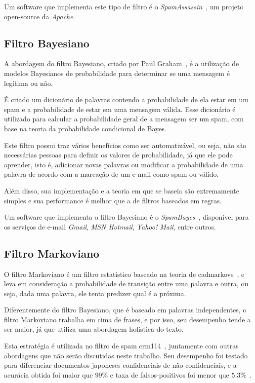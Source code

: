 \documentclass[a4paper,dvipdfm]{article}
\begin{document}
		Um software que implementa este tipo de filtro é o \emph{SpamAssassin}~\cite{spamassassin}, um projeto open-source da \emph{Apache}.

	\subsection{Filtro Bayesiano}
		A abordagem do filtro Bayesiano, criado por Paul Graham~\cite{bayes:graham}, é a utilização de modelos Bayesianos de probabilidade para determinar se uma mensagem é legítima ou não.

		É criado um dicionário de palavras contendo a probabilidade de ela estar em um spam e a probabilidade de estar em uma mensagem válida. Esse dicionário é utilizado para calcular a probabilidade geral de a mensagem ser um spam, com base na teoria da probabilidade condicional de Bayes.

		Este filtro possui traz vários benefícios como ser automatizável, ou seja, não são necessárias pessoas para definir os valores de probabilidade, já que ele pode aprender, isto é, adicionar novas palavras ou modificar a probabilidade de uma palavra de acordo com a marcação de um e-mail como spam ou válido.

		Além disso, sua implementação e a teoria em que se baseia são extremamente simples e sua performance é melhor que a de filtros baseados em regras.
		
		Um software que implementa o filtro Bayesiano é o \emph{SpamBayes}~\cite{spambayes}, disponível para os serviços de e-mail \emph{Gmail}, \emph{MSN Hotmail}, \emph{Yahoo! Mail}, entre outros.

	\subsection{Filtro Markoviano}
		O filtro Markoviano é um filtro estatístico baseado na teoria de \glspl{cadmarkov}~\cite{markov}, e leva em consideração a probabilidade de transição entre uma palavra e outra, ou seja, dada uma palavra, ele tenta predizer qual é a próxima.

		Diferentemente do filtro Bayesiano, que é baseado em palavras independentes, o filtro Markoviano trabalha em cima de frases, e por isso, seu desempenho tende a ser maior, já que utiliza uma abordagem holística do texto.
		
	Esta estratégia é utilizada no filtro de spam \gls{crm114}~\cite{crm114}, juntamente com outras abordagens que não serão discutidas neste trabalho. Seu desempenho foi testado para diferenciar documentos japoneses confidenciais de não confidenciais, e a acurácia obtida foi maior que $99\%$ e taxa de falsos-positivos foi menor que $5.3\%$~\cite{fmarkov:japtest}.
\end{document}
